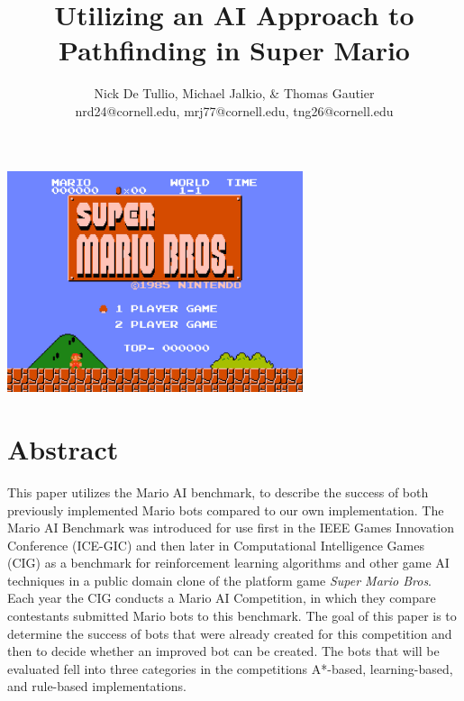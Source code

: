 \documentclass[12pt]{article}
\begin{document}
\title{{\bf \large Utilizing an AI Approach to Pathfinding in Super Mario}\vspace{-2ex}}
\author{{\small Nick De Tullio, Michael Jalkio, \& Thomas Gautier}
\\ {\small nrd24@cornell.edu, mrj77@cornell.edu, tng26@cornell.edu}\vspace{-9ex}}
\date{}

\maketitle
\begin{center}
\includegraphics[width=0.65\textwidth]{waste_of_space} 
\end{center}

\section * {Abstract}
This paper utilizes the Mario AI benchmark, to describe the success of both previously implemented Mario bots 
compared to our own implementation. The Mario AI Benchmark was introduced for use first in the IEEE Games 
Innovation Conference (ICE-GIC) and then later in Computational Intelligence Games (CIG) as a benchmark for 
reinforcement learning algorithms and other game AI techniques in a public domain clone of the platform game {\it 
Super Mario Bros}. Each year the CIG conducts a Mario AI Competition, in which they compare contestants 
submitted Mario bots to this benchmark. The goal of this paper is to determine the success of bots that were already 
created for this competition and then to decide whether an improved bot can be created. The bots that will be 
evaluated fell into three categories in the competitions A*-based, learning-based, and rule-based implementations.
\end{document}
